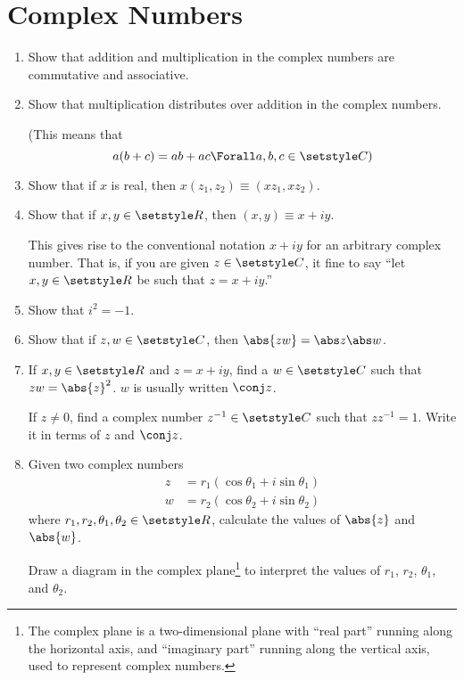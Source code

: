\section{Complex Numbers}

\begin{enumerate}
 \item
  Show that addition and multiplication in the complex numbers are commutative
  and associative.
 \item
  Show that multiplication distributes over addition in the complex numbers.

  (This means that
  \begin{equation*}
   a(b + c) = ab + ac \Forall a, b, c \in \Complex)
  \end{equation*}
 \item
  Show that if \(x\) is real, then \(x(z_1, z_2) \equiv (x z_1, x z_2)\).
 \item
  Show that if \(x, y \in \Reals\), then \((x, y) \equiv x + i y\).

  This gives rise to the conventional notation \(x + iy\) for an arbitrary
  complex number. That is, if you are given \(z \in \Complex\), it fine to say
  ``let \(x, y \in \Reals\) be such that \(z = x + iy\).''
 \item
  Show that \(i^2 = -1\).
 \item
  Show that if \(z, w \in \Complex\), then \(\abs{zw} = \abs z \abs w\).
 \item
  If \(x, y \in \Reals\) and \(z = x + iy\), find a \(w \in \Complex\) such that
  \(zw = \abs{z}^2\). \(w\) is usually written \(\conj z\).

  If \(z \ne 0\), find a complex number \(z^{-1} \in \Complex\) such that
  \(zz^{-1} = 1\). Write it in terms of \(z\) and \(\conj z\).
 \item \label{q_compl_args}
  Given two complex numbers
  \begin{align*}
   z &= r_1(\cos \theta_1 + i \sin \theta_1) \\
   w &= r_2(\cos \theta_2 + i \sin \theta_2)
  \end{align*}
  where \(r_1, r_2, \theta_1, \theta_2 \in \Reals\),
  calculate the values of \(\abs{z}\) and \(\abs{w}\).

  Draw a diagram in the complex plane\footnote{
   The complex plane is a two-dimensional plane with ``real part'' running along
   the horizontal axis, and ``imaginary part'' running along the vertical axis,
   used to represent complex numbers.
  } to interpret the values of
  \(r_1\), \(r_2\), \(\theta_1\), and \(\theta_2\).


\end{enumerate}
